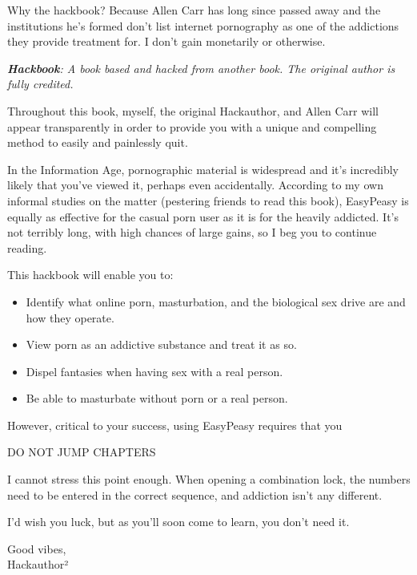 \documentclass[easypeasy.tex]{subfiles}
\begin{document}
Why the hackbook? Because Allen Carr has long since passed away and the institutions he's formed don't list internet pornography as one of the addictions they provide treatment for. I don't gain monetarily or otherwise.

\textit{{\small \textbf{Hackbook}: A book based and hacked from another book. The original author is fully credited.}}

Throughout this book, myself, the original Hackauthor, and Allen Carr will appear transparently in order to provide you with a unique and compelling method to easily and painlessly quit.

In the Information Age, pornographic material is widespread and it's incredibly likely that you've viewed it, perhaps even accidentally. According to my own informal studies on the matter (pestering friends to read this book), EasyPeasy is equally as effective for the casual porn user as it is for the heavily addicted. It's not terribly long, with high chances of large gains, so I beg you to continue reading.

This hackbook will enable you to:
\begin{itemize}
  \item Identify what online porn, masturbation, and the biological sex drive are and how they operate.
  \item View porn as an addictive substance and treat it as so.
  \item Dispel fantasies when having sex with a real person.
  \item Be able to masturbate without porn or a real person.
\end{itemize}

However, critical to your success, using EasyPeasy requires that you

{\huge DO NOT JUMP CHAPTERS}

I cannot stress this point enough. When opening a combination lock, the numbers need to be entered in the correct sequence, and addiction isn't any different.

I'd wish you luck, but as you'll soon come to learn, you don't need it.

Good vibes, \\
Hackauthor²
\end{document}

